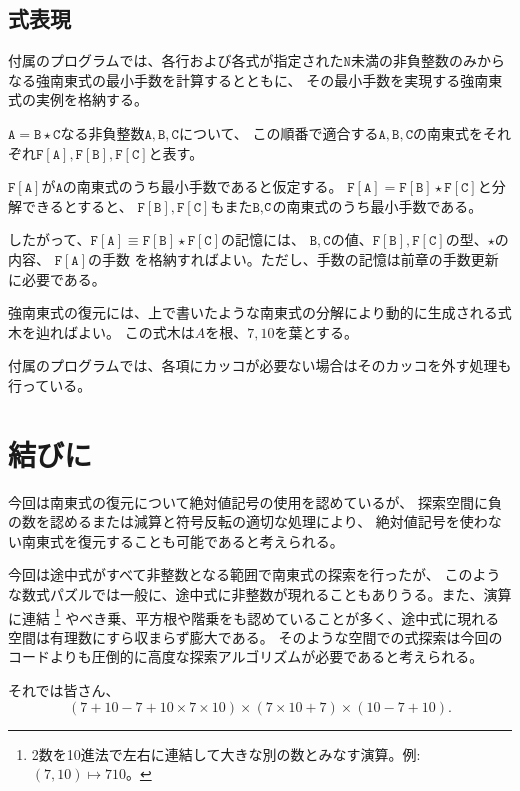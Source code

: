 \documentclass[10pt,dvipdfmx]{ujarticle}
\begin{document}
\subsection{式表現}
付属のプログラムでは、各行および各式が指定された$\mathtt{N}$未満の非負整数のみからなる強南東式の最小手数を計算するとともに、
その最小手数を実現する強南東式の実例を格納する。

\newcommand{\FA}[1]{\mathtt{F[#1]}}
$\mathtt{A}=\mathtt{B}\star \mathtt{C}$なる非負整数$\mathtt{A,B,C}$について、
この順番で適合する$\mathtt{A,B,C}$の南東式をそれぞれ$\FA{A}, \FA{B}, \FA{C}$と表す。

$\FA{A}$が$\mathtt{A}$の南東式のうち最小手数であると仮定する。
$\FA{A}=\FA{B}\star\FA{C}$と分解できるとすると、
$\FA{B},\FA{C}$もまた$\mathtt{B}$,$\tt C$の南東式のうち最小手数である。

したがって、$\FA{A}\equiv \FA B\star\FA C$の記憶には、
$\mathtt{B},\mathtt{C}$の値、$\FA B, \FA C$の型、$\star$の内容、
$\FA{A}$の手数
を格納すればよい。ただし、手数の記憶は前章の手数更新に必要である。

強南東式の復元には、上で書いたような南東式の分解により動的に生成される式木を辿ればよい。
この式木は$A$を根、$7,10$を葉とする。

付属のプログラムでは、各項にカッコが必要ない場合はそのカッコを外す処理も行っている。

\section{結びに}
今回は南東式の復元について絶対値記号の使用を認めているが、
探索空間に負の数を認めるまたは減算と符号反転の適切な処理により、
絶対値記号を使わない南東式を復元することも可能であると考えられる。

今回は途中式がすべて非整数となる範囲で南東式の探索を行ったが、
このような数式パズルでは一般に、途中式に非整数が現れることもありうる。また、演算に連結
\footnote{2数を10進法で左右に連結して大きな別の数とみなす演算。例: $(7, 10)\mapsto 710$。}
やべき乗、平方根や階乗をも認めていることが多く、途中式に現れる空間は有理数にすら収まらず膨大である。
そのような空間での式探索は今回のコードよりも圧倒的に高度な探索アルゴリズムが必要であると考えられる。

それでは皆さん、
\begin{equation*}
    (7+10-7+10\times7\times10)\times(7\times10+7)\times(10-7+10).
\end{equation*}
\printbibliography
\end{document}
